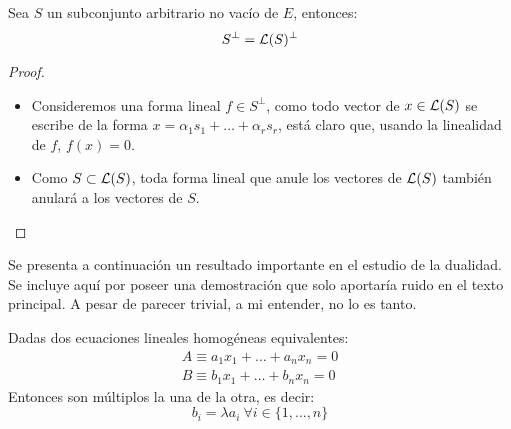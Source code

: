 \begin{lem} Sea $S$ un subconjunto arbitrario no vacío de $E$, entonces:
	\[S^{\perp}=\mathcal{L}(S)^{\perp}\]
\end{lem}\begin{proof}
\begin{itemize}
	\item[\bsubset] Consideremos una forma lineal $f\in S^{\perp}$, como todo vector de $x\in\mathcal{L}(S)$ se escribe de la forma $x=\alpha_1s_1+\dots+\alpha_rs_r$, está claro que, usando la linealidad de $f$, $f(x)=0$.
	\item[\bsetsub] Como $S\subset\mathcal{L}(S)$, toda forma lineal que anule los vectores de $\mathcal{L}(S)$ también anulará a los vectores de $S$.
\end{itemize}
\end{proof}
Se presenta a continuación un resultado importante en el estudio de la dualidad. Se incluye aquí por poseer una demostración que solo aportaría ruido en el texto principal. A pesar de parecer trivial, a mi entender, no lo es tanto.
\begin{prop}
	\label{A1_prop_criterioEquivalencia}
	Dadas dos ecuaciones lineales homogéneas equivalentes:
	\begin{gather*}
		A\equiv a_1x_1+\dots+a_nx_n=0\\
		B\equiv b_1x_1+\dots+b_nx_n=0
	\end{gather*}
	Entonces son múltiplos la una de la otra, es decir:
	\[b_i=\lambda a_i\ \forall i\in\{1,\dots,n\}\]
\end{prop}
